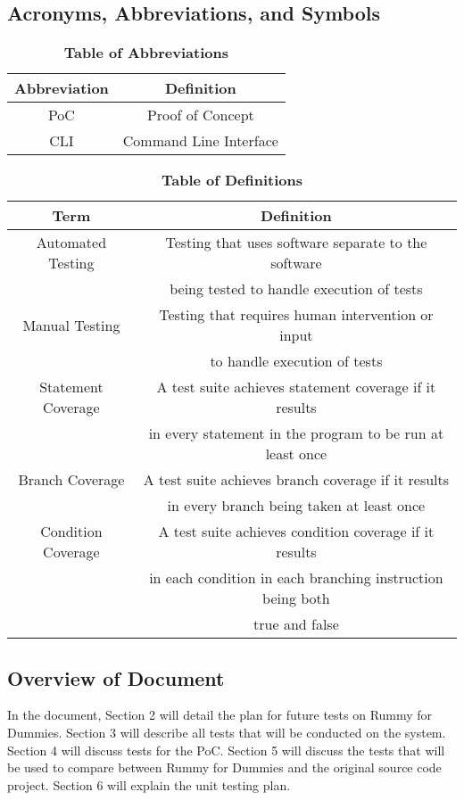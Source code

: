 \documentclass[12pt, titlepage]{article}
\begin{document}
\subsection{Acronyms, Abbreviations, and Symbols}
	
\begin{table}[hbp]
\caption{\textbf{Table of Abbreviations}}
\label{TableAbbrev}
\centering
\begin{tabular}{|c|c|}
    \hline
    \textbf{Abbreviation} & \textbf{Definition} \\
    \hline
    PoC & Proof of Concept \\
    \hline
    CLI & Command Line Interface \\
    \hline
\end{tabular}

\end{table}

\begin{table}[H]
\caption{\textbf{Table of Definitions}}
\label{TableDef}
\centering
\begin{tabular}{|c|c|}
    \hline
    \textbf{Term} & \textbf{Definition}\\
    \hline
    Automated Testing & Testing that uses software separate to the software \\ 
    & being tested to handle execution of tests \\
    \hline
    Manual Testing & Testing that requires human intervention or input \\
    & to handle execution of tests \\
    \hline
    Statement Coverage & A test suite achieves statement coverage if it results \\
     & in every statement in the program to be run at least once \\
    \hline
    Branch Coverage & A test suite achieves branch coverage if it results \\
     & in every branch being taken at least once \\
    \hline
    Condition Coverage & A test suite achieves condition coverage if it results \\
     & in each condition in each branching instruction being both \\ 
     & true and false \\
    \hline
\end{tabular}

\end{table}	

\subsection{Overview of Document}
In the document, Section 2 will detail the plan for future tests on Rummy for Dummies. Section 3 will describe all tests that will be conducted on the system. Section 4 will discuss tests for the PoC. Section 5 will discuss the tests that will be used to compare between Rummy for Dummies and the original source code project. Section 6 will explain the unit testing plan.
\end{document}
